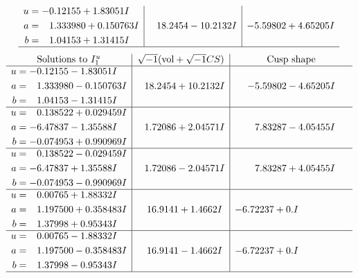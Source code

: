 \documentclass[1p]{elsarticle_modified}
\theoremstyle{definition}
\newcommand{\I}{\sqrt{-1}}
\begin{document}
$$\begin{array}{c|c|c}
\begin{aligned}
u &= -0.12155 + 1.83051 I \\
a &= \phantom{-}1.333980 + 0.150763 I \\
b &= \phantom{-}1.04153 + 1.31415 I\end{aligned}
 & \phantom{-}18.2454 - 10.2132 I & -5.59802 + 4.65205 I\\
 \hline 
 \end{array}$$\newpage$$\begin{array}{c|c|c}  
\text{Solutions to }I^u_{1}& \I (\text{vol} + \sqrt{-1}CS) & \text{Cusp shape}\\
 \hline 
\begin{aligned}
u &= -0.12155 - 1.83051 I \\
a &= \phantom{-}1.333980 - 0.150763 I \\
b &= \phantom{-}1.04153 - 1.31415 I\end{aligned}
 & \phantom{-}18.2454 + 10.2132 I & -5.59802 - 4.65205 I \\ \hline\begin{aligned}
u &= \phantom{-}0.138522 + 0.029459 I \\
a &= -6.47837 - 1.35588 I \\
b &= -0.074953 + 0.990969 I\end{aligned}
 & \phantom{-}1.72086 + 2.04571 I & \phantom{-}7.83287 - 4.05455 I \\ \hline\begin{aligned}
u &= \phantom{-}0.138522 - 0.029459 I \\
a &= -6.47837 + 1.35588 I \\
b &= -0.074953 - 0.990969 I\end{aligned}
 & \phantom{-}1.72086 - 2.04571 I & \phantom{-}7.83287 + 4.05455 I \\ \hline\begin{aligned}
u &= \phantom{-}0.00765 + 1.88332 I \\
a &= \phantom{-}1.197500 + 0.358483 I \\
b &= \phantom{-}1.37998 + 0.95343 I\end{aligned}
 & \phantom{-}16.9141 + 1.4662 I & -6.72237 + 0. I\phantom{ +0.000000I} \\ \hline\begin{aligned}
u &= \phantom{-}0.00765 - 1.88332 I \\
a &= \phantom{-}1.197500 - 0.358483 I \\
b &= \phantom{-}1.37998 - 0.95343 I\end{aligned}
 & \phantom{-}16.9141 - 1.4662 I & -6.72237 + 0. I\phantom{ +0.000000I}\\
 \hline 
 \end{array}$$\newpage\newpage\renewcommand{\arraystretch}{1}
\end{document}
